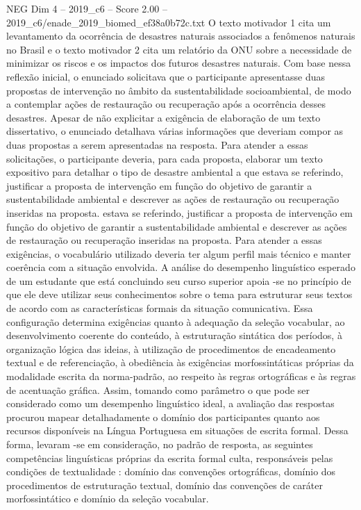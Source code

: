\begin{textsample}{NEG Dim 4 – 2019\_c6 – Score 2.00 – 2019\_c6/enade\_2019\_biomed\_ef38a0b72c.txt}
O texto motivador 1 cita um levantamento da ocorrência de desastres naturais associados a fenômenos naturais no Brasil e o texto motivador 2 cita um relatório da ONU sobre a necessidade de minimizar os riscos e os impactos dos futuros desastres naturais.
Com base nessa reflexão inicial, o enunciado solicitava que o participante apresentasse duas propostas de intervenção no âmbito da sustentabilidade socioambiental, de modo a contemplar ações de restauração ou recuperação após a ocorrência desses desastres.
Apesar de não explicitar a exigência de elaboração de um texto dissertativo, o enunciado detalhava várias informações que deveriam compor as duas propostas a serem apresentadas na resposta.
Para atender a essas solicitações, o participante deveria, para cada proposta, elaborar um texto expositivo para detalhar o tipo de desastre ambiental a que estava se referindo, justificar a proposta de intervenção em função do objetivo de garantir a sustentabilidade ambiental e descrever as ações de restauração ou recuperação inseridas na proposta. estava se referindo, justificar a proposta de intervenção em função do objetivo de garantir a sustentabilidade ambiental e descrever as ações de restauração ou recuperação inseridas na proposta.
Para atender a essas exigências, o vocabulário utilizado deveria ter algum perfil mais técnico e manter coerência com a situação envolvida.
A análise do desempenho linguístico esperado de um estudante que está concluindo seu curso superior apoia -se no princípio de que ele deve utilizar seus conhecimentos sobre o tema para estruturar seus textos de acordo com as características formais da situação comunicativa.
Essa configuração determina exigências quanto à adequação da seleção vocabular, ao desenvolvimento coerente do conteúdo, à estruturação sintática dos períodos, à organização lógica das ideias, à utilização de procedimentos de encadeamento textual e de referenciação, à obediência às exigências morfossintáticas próprias da modalidade escrita da norma-padrão, ao respeito às regras ortográficas e às regras de acentuação gráfica.
Assim, tomando como parâmetro o que pode ser considerado como um desempenho linguístico ideal, a avaliação das respostas procurou mapear detalhadamente o domínio dos participantes quanto aos recursos disponíveis na Língua Portuguesa em situações de escrita formal.
Dessa forma, levaram -se em consideração, no padrão de resposta, as seguintes competências linguísticas próprias da escrita formal culta, responsáveis pelas condições de textualidade : domínio das convenções ortográficas, domínio dos procedimentos de estruturação textual, domínio das convenções de caráter morfossintático e domínio da seleção vocabular.

\end{textsample}
